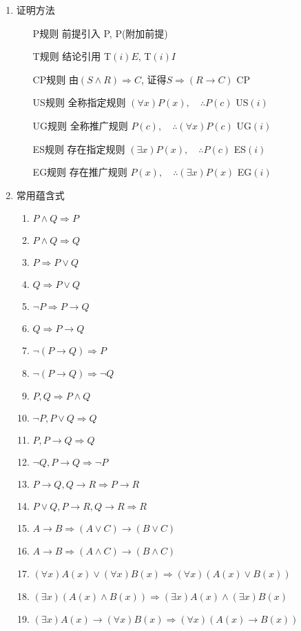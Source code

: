 \begin{enumerate}
\item 证明方法
\begin{enumerate}
\item[P规则] 前提引入 \hfill P, P(附加前提)
\item[T规则] 结论引用 \hfill T$(i)E$, T$(i)I$
\item[CP规则] 由$(S\wedge R) \Rightarrow C$, 证得$S \Rightarrow (R\to C)$ \hfill CP
\item[US规则] 全称指定规则 ${(\forall x)P(x)}, \quad {\therefore P(c)}$  \hfill US$(i)$
\item[UG规则] 全称推广规则 ${P(c)}, \quad {\therefore (\forall x)P(c)}$  \hfill UG$(i)$
\item[ES规则] 存在指定规则 ${(\exists x)P(x)}, \quad {\therefore P(c)}$  \hfill ES$(i)$
\item[EG规则] 存在推广规则 ${P(x)}, \quad {\therefore (\exists x)P(x)}$  \hfill EG$(i)$
\end{enumerate}

\item 常用蕴含式
\begin{enumerate}[label={$I_{\arabic*}$}]
\item $P\wedge Q \Rightarrow P$
\item $P\wedge Q \Rightarrow Q$
\item $P \Rightarrow P\vee Q$
\item $Q \Rightarrow P\vee Q$
\item $\neg P \Rightarrow P\to Q$
\item $Q \Rightarrow P\to Q$
\item $\neg(P\to Q) \Rightarrow P$
\item $\neg(P\to Q) \Rightarrow \neg Q$
\item $P, Q \Rightarrow P\wedge Q$
\item $\neg P, P\vee Q \Rightarrow Q$
\item $P, P\to Q \Rightarrow Q$
\item $\neg Q, P\to Q \Rightarrow \neg P$
\item $P\to Q, Q\to R \Rightarrow P\to R$
\item $P\vee Q, P\to R, Q\to R \Rightarrow R$
\item $A\to B \Rightarrow (A\vee C)\to(B\vee C)$
\item $A\to B \Rightarrow (A\wedge C)\to(B\wedge C)$
\item $(\forall x)A(x)\vee(\forall x)B(x) \Rightarrow (\forall x)(A(x)\vee B(x))$
\item $(\exists x)(A(x)\wedge B(x)) \Rightarrow (\exists x)A(x)\wedge(\exists x)B(x)$
\item $(\exists x)A(x)\to (\forall x)B(x) \Rightarrow (\forall x)(A(x)\to B(x))$
\end{enumerate}


\end{enumerate}
